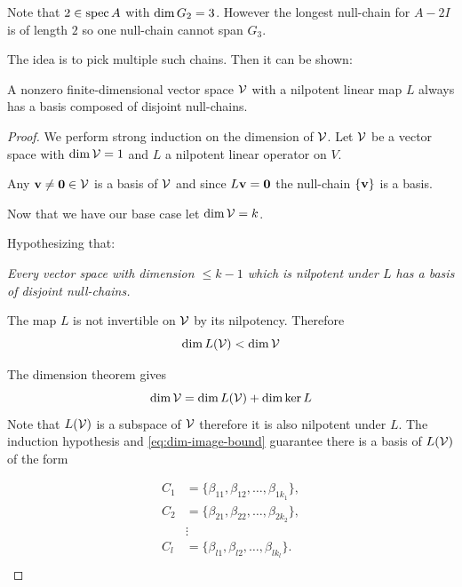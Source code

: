 Note that \(2\in\operatorname{spec} A\) with \(\dim G_2=3\).
However the longest null-chain for \(A-2I\) is of length \(2\) so one null-chain cannot span \(G_3\).

The idea is to pick multiple such chains. Then it can be shown:
\begin{theorem}\label{theorem:multnull}
    A nonzero finite-dimensional vector space \(\mathcal{V}\) with a nilpotent linear map \(L\) always has a basis composed of disjoint null-chains.
\end{theorem}
\begin{proof}


    We perform strong induction on the dimension of \(\mathcal{V}\).
    Let \(\mathcal{V}\) be a vector space with \( \dim\mathcal{V}=1 \) and \(L\) a nilpotent linear operator on \(V\).

    Any \(\mathbf{v}\neq\mathbf{0}\in\mathcal{V}\) is a basis of \(\mathcal{V}\) and since \(L\mathbf{v}=\mathbf{0}\) the null-chain \(\{\mathbf{v}\} \) is a basis.

    Now that we have our base case let \( \dim\mathcal{V}=k \).

    Hypothesizing that:

    \textit{Every vector space with dimension \(\leq k-1\) which is nilpotent under \(L\) has a basis of disjoint null-chains.}

    The map \(L\) is not invertible on \(\mathcal{V}\) by its nilpotency. Therefore
    \begin{equation}\label{eq:dim-image-bound}
        \dim L(\mathcal{V})< \dim\mathcal{V}
    \end{equation}

    The dimension theorem gives 
    \begin{equation}
        \dim\mathcal{V}=\dim L(\mathcal{V}) + \dim\ker L
    \end{equation}
    Note that \(L(\mathcal{V})\) is a subspace of \(\mathcal{V}\) therefore it is also nilpotent under \(L\).
    The induction hypothesis and \eqref{eq:dim-image-bound} guarantee there is a basis of \(L(\mathcal{V})\) of the form


    \begin{align*}
        C_1 & = \{\beta_{11}, \beta_{12}, \ldots, \beta_{1k_1}\}, \\
        C_2 & = \{\beta_{21}, \beta_{22}, \ldots, \beta_{2k_2}\}, \\
            & \vdots                                              \\
        C_l & = \{\beta_{l1}, \beta_{l2}, \ldots, \beta_{lk_l}\}. \\
    \end{align*}


\end{proof}
